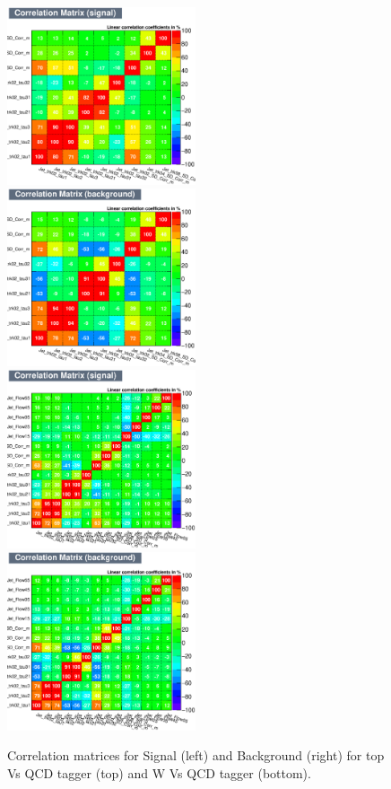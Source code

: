 \begin{figure}[!htb]\centering
\includegraphics[width=0.495\textwidth]{Fig/TMVA/thad_vs_QCD/CorrelationMatrixS.eps}
\includegraphics[width=0.495\textwidth]{Fig/TMVA/thad_vs_QCD/CorrelationMatrixB.eps}
\includegraphics[width=0.495\textwidth]{Fig/TMVA/Whad_vs_QCD/CorrelationMatrixS.eps}
\includegraphics[width=0.495\textwidth]{Fig/TMVA/Whad_vs_QCD/CorrelationMatrixB.eps}
\caption{Correlation matrices for Signal (left) and Background (right) for top Vs QCD tagger (top) and W Vs QCD tagger (bottom).}
\label{fig:TMVA_corr_matrix}
\end{figure}

